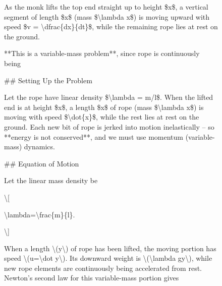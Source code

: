 \begin{figure}[t]
\begin{answercol}[equal height group=ansX4]
  As the monk lifts the top end straight up to height \$x\$, a vertical segment of length \$x\$ (mass \$\textbackslash{}lambda x\$) is moving upward with speed \$v = \textbackslash{}dfrac\{dx\}\{dt\}\$, while the remaining rope lies at rest on the ground.\par\vspace{2pt}
  **This is a variable-mass problem**, since rope is continuously being\par\vspace{3pt}\elide
\end{answercol}\hspace{\columnsep}%
\begin{answercol}[equal height group=ansX4]
  \caret{}\par\vspace{4pt}
  \raggedright \#\# Setting Up the Problem\par\vspace{2pt}
  Let the rope have linear density \$\textbackslash{}lambda = m/l\$. When the lifted end is at height \$x\$, a length \$x\$ of rope (mass \$\textbackslash{}lambda x\$) is moving with speed \$\textbackslash{}dot\{x\}\$, while the rest lies at rest on the ground. Each new bit of rope is jerked into motion inelastically -- so **energy is not conserved**, and we must use momentum (variable-mass) dynamics.\par\vspace{2pt}
  \#\# Equation of Motion\par\vspace{3pt}\elide
\end{answercol}\hspace{\columnsep}%
\begin{answercol}[equal height group=ansX4]
  \caret{}\par\vspace{4pt}
  \raggedright Let the linear mass density be\par\vspace{2pt}
  \textbackslash{}[\par\vspace{2pt}
  \textbackslash{}lambda=\textbackslash{}frac\{m\}\{l\}.\par\vspace{2pt}
  \textbackslash{}]\par\vspace{2pt}
  When a length \textbackslash{}(y\textbackslash{}) of rope has been lifted, the moving portion has speed \textbackslash{}(u=\textbackslash{}dot y\textbackslash{}). Its downward weight is \textbackslash{}(\textbackslash{}lambda gy\textbackslash{}), while new rope elements are continuously being accelerated from rest. Newton's second law for this variable-mass portion gives\par\vspace{3pt}\elide

\end{answercol}
\end{figure}
